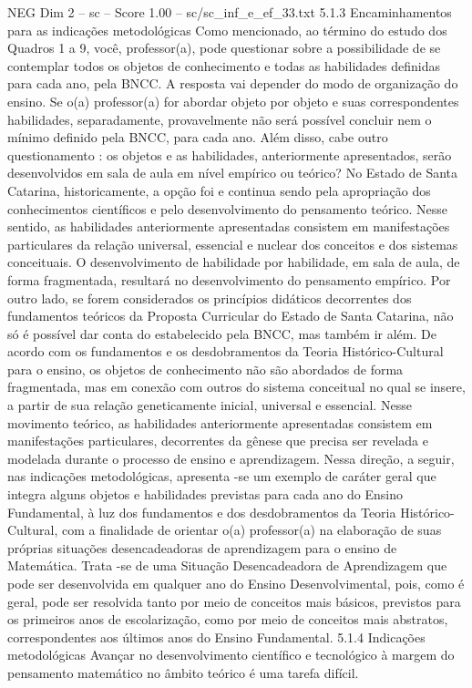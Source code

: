 \begin{textsample}{NEG Dim 2 – sc – Score 1.00 – sc/sc\_inf\_e\_ef\_33.txt}  \label{ex:f2_neg_276}
5.1.3 Encaminhamentos para as indicações metodológicas Como mencionado, ao término do estudo dos Quadros 1 a 9, você, professor(a), pode questionar sobre a possibilidade de se contemplar todos os objetos de conhecimento e todas as habilidades definidas para cada ano, pela BNCC.
A resposta vai depender do modo de organização do ensino.
Se o(a) professor(a) for abordar objeto por objeto e suas correspondentes habilidades, separadamente, provavelmente não será possível concluir nem o mínimo definido pela BNCC, para cada ano.
Além disso, cabe outro questionamento : os objetos e as habilidades, anteriormente apresentados, serão desenvolvidos em sala de aula em nível empírico ou teórico?
No Estado de Santa Catarina, historicamente, a opção foi e continua sendo pela apropriação dos conhecimentos científicos e pelo desenvolvimento do pensamento teórico.
Nesse sentido, as habilidades anteriormente apresentadas consistem em manifestações particulares da relação universal, essencial e nuclear dos conceitos e dos sistemas conceituais.
O desenvolvimento de habilidade por habilidade, em sala de aula, de forma fragmentada, resultará no desenvolvimento do pensamento empírico.
Por outro lado, se forem considerados os princípios didáticos decorrentes dos fundamentos teóricos da Proposta Curricular do Estado de Santa Catarina, não só é possível dar conta do estabelecido pela BNCC, mas também ir além.
De acordo com os fundamentos e os desdobramentos da Teoria Histórico-Cultural para o ensino, os objetos de conhecimento não são abordados de forma fragmentada, mas em conexão com outros do sistema conceitual no qual se insere, a partir de sua relação geneticamente inicial, universal e essencial.
Nesse movimento teórico, as habilidades anteriormente apresentadas consistem em manifestações particulares, decorrentes da gênese que precisa ser revelada e modelada durante o processo de ensino e aprendizagem.
Nessa direção, a seguir, nas indicações metodológicas, apresenta -se um exemplo de caráter geral que integra alguns objetos e habilidades previstas para cada ano do Ensino Fundamental, à luz dos fundamentos e dos desdobramentos da Teoria Histórico-Cultural, com a finalidade de orientar o(a) professor(a) na elaboração de suas próprias situações desencadeadoras de aprendizagem para o ensino de Matemática.
Trata -se de uma Situação Desencadeadora de Aprendizagem que pode ser desenvolvida em qualquer ano do Ensino Desenvolvimental, pois, como é geral, pode ser resolvida tanto por meio de conceitos mais básicos, previstos para os primeiros anos de escolarização, como por meio de conceitos mais abstratos, correspondentes aos últimos anos do Ensino Fundamental. 5.1.4 Indicações metodológicas Avançar no desenvolvimento científico e tecnológico à margem do pensamento matemático no âmbito teórico é uma tarefa difícil.

\end{textsample}
